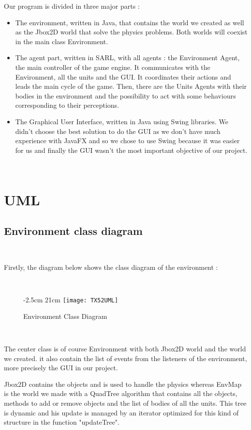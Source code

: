 \documentclass[a4paper,10pt]{book}
\begin{document}
Our program is divided in three major parts :
\begin{itemize}
 \item The environment, written in Java, that contains the world we created as well as the Jbox2D world that solve the physics
 problems. Both worlds will coexist in the main class Environment.
 \item The agent part, written in SARL, with all agents : the Environment Agent, the main controller of the game engine. It
 communicates with the Environment, all the units and the GUI. It coordinates their actions and leads the main cycle of the game.
 Then, there are the Units Agents with their bodies in the environment and the possibility to act with some behaviours corresponding to
 their perceptions.
 \item The Graphical User Interface, written in Java using Swing libraries. We didn't choose the best solution to do the GUI as
 we don't have much experience with JavaFX and so we chose to use Swing because it was easier for us and finally the GUI wasn't the most
 important objective of our project.
\end{itemize}

~
\newpage
\section {UML}
\subsection{Environment class diagram}
~

Firstly, the diagram below shows the class diagram of the environment :

~

\begin{figure}[!ht]
  -2.5cm 21cm
 \centering
 \texttt{[image: TX52UML]}
 \caption{Environment Class Diagram}
\end{figure}

~

The center class is of course Environment with both Jbox2D world and the world we created. it also contain the list of events from the listeners of the environment, more precisely the GUI in our project.

Jbox2D contains the objects and is used to handle the physics whereas EnvMap is the world we made with a QuadTree algorithm that contains all the objects, methods to add or remove objects and the list of bodies of all the units. This tree is dynamic and his update is managed by an iterator optimized for this kind of structure in the function "updateTree".
\end{document}
